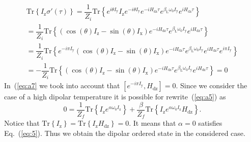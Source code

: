\documentclass[review]{elsarticle}
\newcommand{\tr}[1]{\mathrm{Tr} \left\{ #1 \right\}}
\newcommand{\sx}{I_\mathrm{x}}
\newcommand{\sy}{I_\mathrm{y}}
\newcommand{\sz}{I_\mathrm{z}}
\newcommand{\hdz}{H_\mathrm{dz}}
\begin{document}
\begin{multline}
    \label{eq:a7} 
    \tr{I_\mathrm{z} \sigma'(\tau)}
    =  \dfrac{1}{Z_{i}} \tr{
        e^{i \theta \sy} \sz e^{-i \theta \sy}
        e^{-i \hdz \tau} e^{\beta_\mathrm{L} \omega_{0} \sy} e^{i \hdz \tau}
    } 
    \\
    = \dfrac{1}{Z_i} \tr{
        \left( \cos(\theta) \sz - \sin(\theta) \sx \right) 
        e^{-i \hdz \tau} e^{\beta_\mathrm{L} \omega_{0} \sy} e^{i \hdz \tau}
    }
    \\
    = \dfrac{1}{Z_i} \tr{
        e^{-i \pi \sy}  
        \left( \cos(\theta) \sz - \sin(\theta) \sx \right) 
        e^{-i \hdz \tau} e^{\beta_\mathrm{L} \omega_{0} \sy} e^{i \hdz \tau}
        e^{i \pi \sy}  
    }
    \\
    = - \dfrac{1}{Z_i} \tr{
        \left( \cos(\theta) \sz - \sin(\theta) \sx \right) 
        e^{-i \hdz \tau} e^{\beta_\mathrm{L} \omega_{0} \sy} e^{i \hdz \tau} 
    } = 0
\end{multline}
%
In~(\ref{eq:a7} we took into account that $\left[ e^{-i \pi \sy}, \hdz \right] = 0$.
Since we consider the case of a high dipolar temperature it is possible for rewrite~(\ref{eq:a5}) as
\begin{equation}
    \label{eq:a8}
    0 = \dfrac{1}{Z_f} \tr{ \sz e^{\alpha \omega_0 \sz}}
    + \dfrac{\beta}{Z_f} \tr{\sz e^{\alpha \omega_0 \sz} \hdz}.
\end{equation}
%
Notice that $\tr{\sz} = \tr{\sz\hdz} = 0$. It means that $\alpha = 0$ satisfies Eq.~(\ref{eq:5}). 
Thus we obtain the dipolar ordered state in the considered case.


\end{document}

